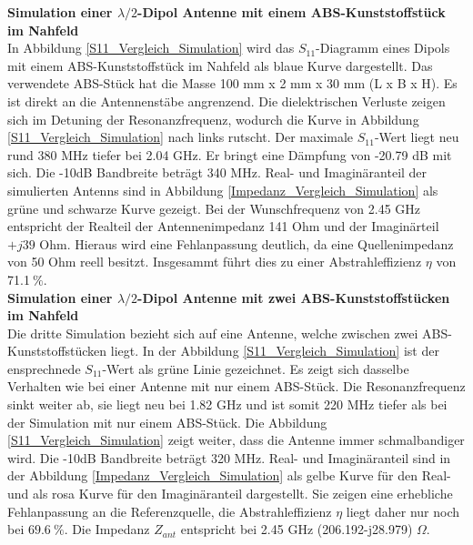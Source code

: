 \textbf{Simulation einer $\lambda/2$-Dipol Antenne mit einem ABS-Kunststoffstück im Nahfeld}\\
In Abbildung \ref{S11_Vergleich_Simulation} wird das $S_{11}$-Diagramm eines Dipols mit einem ABS-Kunststoffstück im Nahfeld als blaue Kurve dargestellt. Das verwendete ABS-Stück hat die Masse 100 mm x 2 mm x 30 mm (L x B x H). Es ist direkt an die Antennenstäbe angrenzend. Die dielektrischen Verluste zeigen sich im Detuning der Resonanzfrequenz, wodurch die Kurve in Abbildung \ref{S11_Vergleich_Simulation} nach links rutscht. Der maximale $S_{11}$-Wert liegt neu rund 380 MHz tiefer bei 2.04 GHz. Er bringt eine Dämpfung von -20.79 dB mit sich. Die -10dB Bandbreite beträgt 340 MHz. Real- und Imaginäranteil der simulierten Antenns sind in Abbildung \ref{Impedanz_Vergleich_Simulation} als grüne und schwarze Kurve gezeigt. Bei der Wunschfrequenz von 2.45 GHz entspricht der Realteil der Antennenimpedanz 141 Ohm und der Imaginärteil  $+j39$ Ohm. Hieraus wird eine Fehlanpassung deutlich, da eine Quellenimpedanz von 50 Ohm reell besitzt. Insgesammt führt dies zu einer Abstrahleffizienz $\eta$ von 71.1$\ \%$.\\

\textbf{Simulation einer $\lambda/2$-Dipol Antenne mit zwei ABS-Kunststoffstücken im Nahfeld}\\
Die dritte Simulation bezieht sich auf eine Antenne, welche  zwischen zwei ABS-Kunststoffstücken liegt. In der Abbildung \ref{S11_Vergleich_Simulation} ist der ensprechnede $S_{11}$-Wert als grüne Linie gezeichnet. Es zeigt sich dasselbe Verhalten wie bei einer Antenne mit nur einem ABS-Stück. Die Resonanzfrequenz sinkt weiter ab, sie liegt neu bei 1.82 GHz und ist somit 220 MHz tiefer als bei der Simulation mit nur einem ABS-Stück. Die Abbildung \ref{S11_Vergleich_Simulation} zeigt weiter, dass die Antenne immer schmalbandiger wird. Die -10dB Bandbreite beträgt 320 MHz. Real- und Imaginäranteil sind in der Abbildung \ref{Impedanz_Vergleich_Simulation} als gelbe Kurve für den Real- und als rosa Kurve für den Imaginäranteil dargestellt. Sie zeigen eine erhebliche Fehlanpassung an die Referenzquelle, die Abstrahleffizienz $\eta$ liegt daher nur noch bei $69.6 \ \%$. Die Impedanz $Z_{ant}$ entspricht bei 2.45 GHz (206.192-j28.979) $\Omega$.\\




